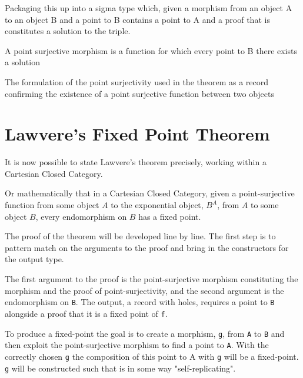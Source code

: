 Packaging this up into a sigma type which, given a morphism from an object A to
an object B and a point to B contains a point to A and a proof that is
constitutes a solution to the triple.


A point surjective morphism is a function for which every point to B there
exists a solution


The formulation of the point surjectivity used in the theorem as a record
confirming the existence of a point surjective function between two objects


\section{Lawvere's Fixed Point Theorem}

It is now possible to state Lawvere's theorem precisely, working within a
Cartesian Closed Category.


Or mathematically that in a Cartesian Closed Category, given a point-surjective
function from some object $A$ to the exponential object, $B^A$, from $A$ to some object
$B$, every endomorphism on $B$ has a fixed point.

The proof of the theorem will be developed line by line. The first step is to
pattern match on the arguments to the proof and bring in the constructors for
the output type.

\begin{AgdaMultiCode}
\end{AgdaMultiCode}

The first argument to the proof is the point-surjective morphism constituting
the morphism and the proof of point-surjectivity, and the second argument is the
endomorphism on \verb|B|. The output, a record with holes, requires a point to
\verb|B| alongside a proof that it is a fixed point of \verb|f|.

To produce a fixed-point the goal is to create a morphism, \verb|g|,  from \verb|A| to
\verb|B| and then exploit the point-surjective morphism to find a point to
\verb|A|. With the correctly chosen \verb|g| the composition of this point to A
with \verb|g| will be a fixed-point. \verb|g| will be constructed such that is
in some way "self-replicating".

